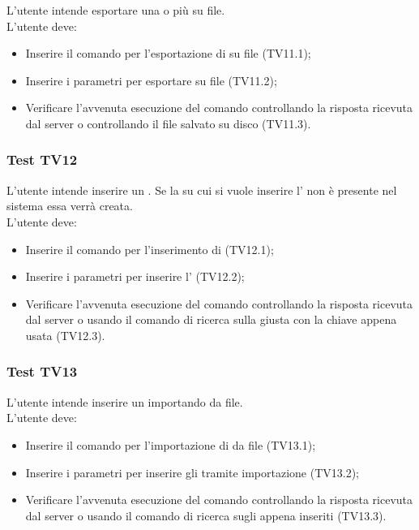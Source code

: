 \documentclass{scalatekids-article}
\begin{document}
L'utente intende esportare una o più  su file.\\
L'utente deve:
\begin{itemize}
\item Inserire il comando per l'esportazione di  su file (TV11.1);
\item Inserire i parametri per esportare  su file (TV11.2);
\item Verificare l'avvenuta esecuzione del comando controllando la risposta ricevuta dal server o controllando il file salvato su disco (TV11.3).
\end{itemize}

\subsubsection{Test TV12}

L'utente intende inserire un . Se la  su cui si
vuole inserire l' non è presente nel sistema essa verrà creata.\\
L'utente deve:
\begin{itemize}
\item Inserire il comando per l'inserimento di  (TV12.1);
\item Inserire i parametri per inserire l' (TV12.2);
\item Verificare l'avvenuta esecuzione del comando controllando la risposta ricevuta dal server o usando il comando di ricerca sulla  giusta con la chiave appena usata (TV12.3).
\end{itemize}

\subsubsection{Test TV13}

L'utente intende inserire un  importando da file.\\
L'utente deve:
\begin{itemize}
\item Inserire il comando per l'importazione di  da file (TV13.1);
\item Inserire i parametri per inserire gli  tramite importazione (TV13.2);
\item Verificare l'avvenuta esecuzione del comando controllando la risposta ricevuta dal server o usando il comando di ricerca sugli  appena inseriti (TV13.3).
\end{itemize}
\end{document}
